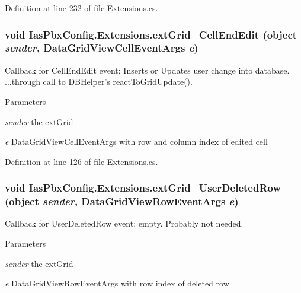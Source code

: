 Definition at line 232 of file Extensions.cs.\hypertarget{class_ias_pbx_config_1_1_extensions_a3fd06e7a96ab4f85614ce3e556e626ae}{
\subsubsection[{extGrid\_\-CellEndEdit}]{\setlength{\rightskip}{0pt plus 5cm}void IasPbxConfig.Extensions.extGrid\_\-CellEndEdit (object {\em sender}, \/  DataGridViewCellEventArgs {\em e})}}
\label{class_ias_pbx_config_1_1_extensions_a3fd06e7a96ab4f85614ce3e556e626ae}


Callback for CellEndEdit event; Inserts or Updates user change into database. ...through call to DBHelper's reactToGridUpdate().


\begin{DoxyParams}{Parameters}
\item[{\em sender}]the extGrid \item[{\em e}]DataGridViewCellEventArgs with row and column index of edited cell \end{DoxyParams}


Definition at line 126 of file Extensions.cs.\hypertarget{class_ias_pbx_config_1_1_extensions_a499905d72e84d3c888be21271662d3d8}{
\subsubsection[{extGrid\_\-UserDeletedRow}]{\setlength{\rightskip}{0pt plus 5cm}void IasPbxConfig.Extensions.extGrid\_\-UserDeletedRow (object {\em sender}, \/  DataGridViewRowEventArgs {\em e})}}
\label{class_ias_pbx_config_1_1_extensions_a499905d72e84d3c888be21271662d3d8}


Callback for UserDeletedRow event; empty. Probably not needed.


\begin{DoxyParams}{Parameters}
\item[{\em sender}]the extGrid \item[{\em e}]DataGridViewRowEventArgs with row index of deleted row \end{DoxyParams}


